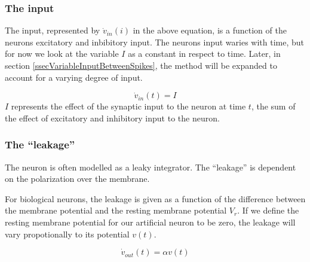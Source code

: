 \subsubsection{The input}
The input, represented by $\dot{v}_{in}(i)$ in the above equation, is a function of the neurons excitatory and inbibitory input. 
The neurons input waries with time, but for now we look at the variable $I$ as a constant in respect to time.
Later, in section \ref{ssecVariableInputBetweenSpikes}, the method will be expanded to account for a varying degree of input. %

\begin{equation}
	\dot{v}_{in}(t) = I
\end{equation}
$I$ represents the effect of the synaptic input to the neuron at time $t$, the sum of the effect of excitatory and inhibitory input to the neuron.



\subsubsection{The ``leakage''}
The neuron is often modelled as a leaky integrator. The ``leakage'' is dependent on the polarization over the membrane. 

For biological neurons, the leakage is given as a function of the difference between the membrane potential and the resting membrane potential $V_r$. 
If we define the resting membrane potential for our artificial neuron to be zero, the leakage will vary propotionally to its potential $v(t)$.

\begin{equation}
	\dot{v}_{out}(t) = \alpha v(t)
\end{equation}

